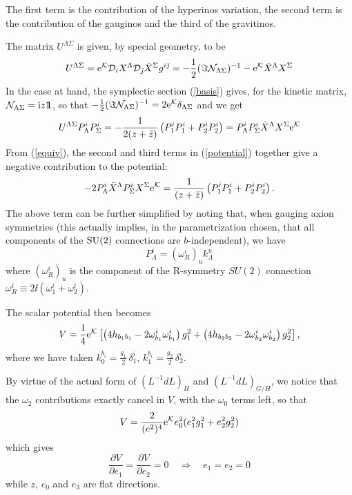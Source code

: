 \documentclass[a4paper,12pt]{article}
\begin{document}
The first term is the contribution of the hyperinos variation, the second term is the contribution of the 
gauginos and the third of the gravitinos.

The matrix $U^{\Lambda\Sigma}$ is given, by special geometry, to be 
\begin{equation}
U^{\Lambda\Sigma} ={\rm e}^{\mathcal K} {\mathcal D}_i X^\Lambda{\mathcal D}_{\bar\jmath}\bar X^\Sigma g^{i\bar\jmath}=
-\frac 12 (\Im {\mathcal N}_{\Lambda\Sigma})^{-1} - {\rm e}^{\mathcal K}\bar X^\Lambda X^\Sigma 
\end{equation}
In the case at hand, the symplectic section (\ref{basis}) gives, for the kinetic matrix,
  ${\mathcal N}_{\Lambda\Sigma}= \mathrm{i} z \relax{\rm 1\kern-.35em 1}$, so that
 $-\frac 12 (\Im {\mathcal N}_{\Lambda\Sigma})^{-1}=2{\rm e}^{\mathcal K}\delta_{\Lambda\Sigma}$ and we get
\begin{equation}
U^{\Lambda\Sigma} P^i_\Lambda P^i_\Sigma = -\frac 1 {2 (z+\bar z)}\left(
P^i_1 P^i_1 + P^i_2 P^i_2\right)=
P^i_\Lambda P^i_\Sigma \bar X^\Lambda X^\Sigma {\rm e}^{\mathcal K}
\label{equiv}
\end{equation}
From (\ref{equiv}), the second and third terms in (\ref{potential}) 
together give a negative contribution to the potential:
\begin{equation}
-2 P^i_\Lambda \bar X^\Lambda P^i_\Sigma X^\Sigma {\rm e}^{\mathcal K} = \frac 1 {(z+\bar z)}
\left(P^i_1 P^i_1 + P^i_2 P^i_2\right).
\end{equation}
The above term can be further simplified by noting that, when gauging axion symmetries (this actually implies, 
in the parametrization chosen, that all components of the $\mathrm{SU}(2)$ connections are $b$-independent), we have \cite{abcdffm,mic,agata}
\begin{equation}
P^i_\Lambda = (\omega^i_R)_u k^u_\Lambda
\label{simplep}
\end{equation}
where $ (\omega^i_R)_u$ is the component of the R-symmetry $SU(2)$ connection $\omega_R^i\equiv 2\ii(\omega_1^i+\omega_2^i)$.

The scalar potential then becomes
\begin{equation}
V =\frac 14 {\rm e}^{\mathcal K}\left[ \left(4 h_{b_1 b_1} - 2 \omega^i_{b_1} \omega^i_{b_1}\right)g_1^2 +
 \left(4 h_{b_2 b_2} - 2 \omega^i_{b_2} \omega^i_{b_2}\right)g_2^2 \right]
, \label{potentialsimpl}
\end{equation}
where we have taken $k^{b_i}_0 =\frac{g_1}2\, \delta ^i_1  $, $k^{b_i}_1 =\frac{g_2}2\, \delta ^i_2  $.

By virtue of the actual form of $(L^{-1}dL)_{H}$ and $(L^{-1}dL)_{G/H}$, we notice that the $\omega_2$ contributions
exactly cancel in $V$, with the $\omega_0$ terms left, so that
\begin{equation}
V=\frac 2{(e^2)^4} {\rm e}^{\mathcal K}  e_0^2 (e_1^2 g_1^2 + e_2^2 g_2^2)
\end{equation}
which gives
\begin{equation}
\frac{\partial V}{\partial e_1} = \frac{\partial V}{\partial e_2}=0 \quad \Rightarrow \quad e_1 =e_2 =0
\end{equation}
while $z$, $e_0$ and $e_3$ are flat directions.
\end{document}
